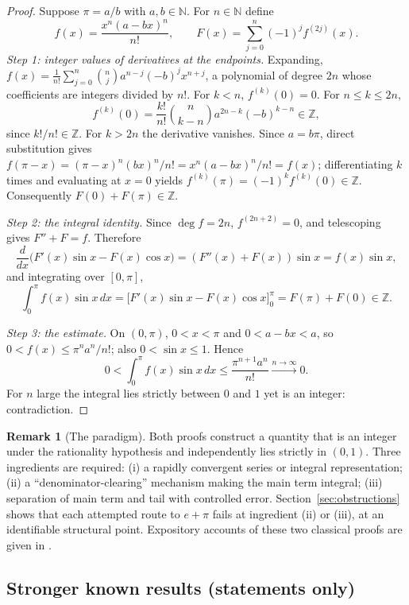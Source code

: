 \documentclass[11pt]{amsart}
\theoremstyle{definition}
\newtheorem{remark}[theorem]{Remark}
\theoremstyle{remark}
\numberwithin{equation}{section}
\newcommand{\Z}{\mathbb{Z}}
\newcommand{\N}{\mathbb{N}}
\begin{document}
\begin{proof}
Suppose $\pi=a/b$ with $a,b\in\N$. For $n\in\N$ define
\[
f(x)=\frac{x^n(a-bx)^n}{n!},\qquad F(x)=\sum_{j=0}^{n}(-1)^j f^{(2j)}(x).
\]
\emph{Step 1: integer values of derivatives at the endpoints.} Expanding, $f(x)=\frac{1}{n!}\sum_{j=0}^n\binom{n}{j}a^{n-j}(-b)^j x^{n+j}$, a polynomial of degree $2n$ whose coefficients are integers divided by $n!$. For $k<n$, $f^{(k)}(0)=0$. For $n\le k\le 2n$,
\[
f^{(k)}(0)=\frac{k!}{n!}\binom{n}{k-n}a^{2n-k}(-b)^{k-n}\in\Z,
\]
since $k!/n!\in\Z$. For $k>2n$ the derivative vanishes. Since $a=b\pi$, direct substitution gives $f(\pi-x)=(\pi-x)^n(bx)^n/n!=x^n(a-bx)^n/n!=f(x)$; differentiating $k$ times and evaluating at $x=0$ yields $f^{(k)}(\pi)=(-1)^k f^{(k)}(0)\in\Z$. Consequently $F(0)+F(\pi)\in\Z$.

\emph{Step 2: the integral identity.} Since $\deg f=2n$, $f^{(2n+2)}=0$, and telescoping gives $F''+F=f$. Therefore
\[
\frac{d}{dx}\bigl(F'(x)\sin x-F(x)\cos x\bigr)=(F''(x)+F(x))\sin x=f(x)\sin x,
\]
and integrating over $[0,\pi]$,
\[
\int_0^\pi f(x)\sin x\,dx=\bigl[F'(x)\sin x-F(x)\cos x\bigr]_0^\pi=F(\pi)+F(0)\in\Z.
\]

\emph{Step 3: the estimate.} On $(0,\pi)$, $0<x<\pi$ and $0<a-bx<a$, so $0<f(x)\le\pi^n a^n/n!$; also $0<\sin x\le1$. Hence
\[
0<\int_0^\pi f(x)\sin x\,dx\le\frac{\pi^{n+1}a^n}{n!}\xrightarrow{n\to\infty}0.
\]
For $n$ large the integral lies strictly between $0$ and $1$ yet is an integer: contradiction.
\end{proof}

\begin{remark}[The paradigm]\label{rem:paradigm}
Both proofs construct a quantity that is an integer under the rationality hypothesis and independently lies strictly in $(0,1)$. Three ingredients are required: (i) a rapidly convergent series or integral representation; (ii) a ``denominator-clearing'' mechanism making the main term integral; (iii) separation of main term and tail with controlled error. Section~\ref{sec:obstructions} shows that each attempted route to $e+\pi$ fails at ingredient (ii) or (iii), at an identifiable structural point. Expository accounts of these two classical proofs are given in \cite{Conrad}.
\end{remark}

\subsection{Stronger known results (statements only)}
\end{document}
